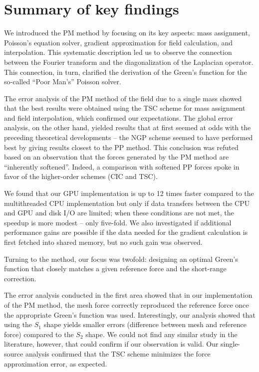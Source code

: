 \section{Summary of key findings}
We introduced the PM method by focusing on its key aspects: mass assignment, Poisson's equation solver, gradient approximation for field calculation, and interpolation.
This systematic description led us to observe the connection between the Fourier transform and the diagonalization of the Laplacian operator.
This connection, in turn, clarified the derivation of the Green's function for the so-called ``Poor Man's'' Poisson solver.

The error analysis of the PM method of the field due to a single mass showed that the best results were obtained using the TSC scheme for mass assignment and field interpolation, which confirmed our expectations.
The global error analysis, on the other hand, yielded results that at first seemed at odds with the preceding theoretical developments -- the NGP scheme seemed to have performed best by giving results closest to the PP method.
This conclusion was refuted based on an observation that the forces generated by the PM method are ``inherently softened''.
Indeed, a comparison with softened PP forces spoke in favor of the higher-order schemes (CIC and TSC).

We found that our GPU implementation is up to 12 times faster compared to the multithreaded CPU implementation but only if data transfers between the CPU and GPU and disk I/O are limited; when these conditions are not met, the speedup is more modest -- only five-fold.
We also investigated if additional performance gains are possible if the data needed for the gradient calculation is first fetched into shared memory, but no such gain was observed.

Turning to the \PThreeM{} method, our focus was twofold: designing an optimal Green's function that closely matches a given reference force and the short-range correction.

The error analysis conducted in the first area showed that in our implementation of the PM method, the mesh force correctly reproduced the reference force once the appropriate Green's function was used.
Interestingly, our analysis showed that using the $S_1$ shape yields smaller errors (difference between mesh and reference force) compared to the $S_2$ shape.
We could not find any similar study in the literature, however, that could confirm if our observation is valid.
Our single-source analysis confirmed that the TSC scheme minimizes the force approximation error, as expected.

